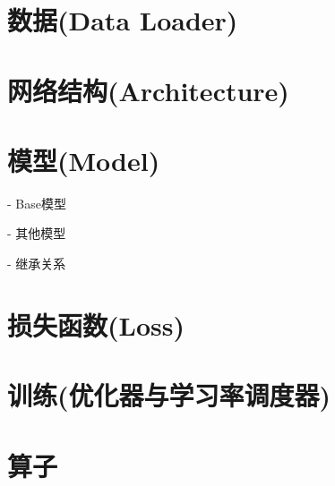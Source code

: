 \documentclass[../main.tex]{subfiles}
\begin{document}
\section{数据(Data Loader)}

\section{网络结构(Architecture)}

\section{模型(Model)}

- Base模型

- 其他模型

- 继承关系

\section{损失函数(Loss)}

\section{训练(优化器与学习率调度器)}

\section{算子}
\end{document}
